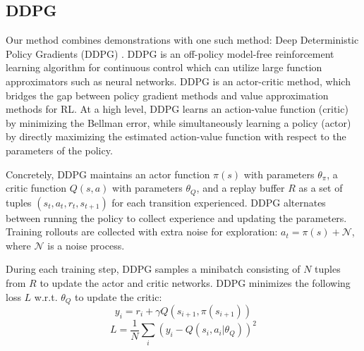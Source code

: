 \documentclass[letterpaper, 10 pt, conference]{ieeeconf}  %
\DeclareMathOperator{\E}{\mathbb{E}}
\begin{document}


\subsection{DDPG}

Our method combines demonstrations with one such method: Deep Deterministic Policy Gradients (DDPG) \cite{lillicrap2015continuous}. 
DDPG is an off-policy model-free reinforcement learning algorithm for continuous control which can utilize large function approximators such as neural networks. DDPG is an actor-critic method, which bridges the gap between policy gradient methods and value approximation methods for RL. At a high level, DDPG learns an action-value function (critic) by minimizing the Bellman error, while simultaneously learning a policy (actor) by directly maximizing the estimated action-value function with respect to the parameters of the policy.

Concretely, DDPG maintains an actor function $\pi(s)$ with parameters $\theta_\pi$, a critic function $Q(s, a)$ with parameters $\theta_Q$, and a replay buffer $R$ as a set of tuples $(s_t, a_t, r_t, s_{t+1})$ for each transition experienced. DDPG alternates between running the policy to collect experience and updating the parameters. Training rollouts are collected with extra noise for exploration: $a_t = \pi(s) + \mathcal{N}$, where $\mathcal{N}$ is a noise process.

During each training step, DDPG samples a minibatch consisting of $N$ tuples from $R$ to update the actor and critic networks. DDPG minimizes the following loss $L$ w.r.t. $\theta_Q$ to update the critic:
\begin{equation} \label{eq:target}
    y_i = r_i + \gamma Q(s_{i+1}, \pi(s_{i+1}))
\end{equation}
\begin{equation}
    L = \frac{1}{N}\sum_i (y_i - Q(s_i, a_i|\theta_Q))^2
\end{equation}
\end{document}
